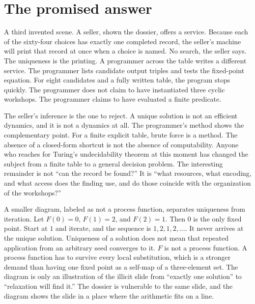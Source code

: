 \documentclass[11pt]{article}
\begin{document}
\section{The promised answer}
\label{sec:seller}

A third invented scene. A seller, shown the dossier, offers a service. Because each of the sixty-four choices has exactly one completed record, the seller’s machine will print that record at once when a choice is named. No search, the seller says. The uniqueness is the printing. A programmer across the table writes a different service. The programmer lists candidate output triples and tests the fixed-point equation. For eight candidates and a fully written table, the program stops quickly. The programmer does not claim to have instantiated three cyclic workshops. The programmer claims to have evaluated a finite predicate.

The seller’s inference is the one to reject. A unique solution is not an efficient dynamics, and it is not a dynamics at all. The programmer’s method shows the complementary point. For a finite explicit table, brute force is a method. The absence of a closed-form shortcut is not the absence of computability. Anyone who reaches for Turing’s undecidability theorem at this moment has changed the subject from a finite table to a general decision problem. The interesting remainder is not ``can the record be found?'' It is ``what resources, what encoding, and what access does the finding use, and do those coincide with the organization of the workshops?''

A smaller diagram, labeled as not a process function, separates uniqueness from iteration. Let \(F(0) = 0\), \(F(1) = 2\), and \(F(2) = 1\). Then \(0\) is the only fixed point. Start at \(1\) and iterate, and the sequence is \(1, 2, 1, 2, \ldots\). It never arrives at the unique solution. Uniqueness of a solution does not mean that repeated application from an arbitrary seed converges to it. \(F\) is not a process function. A process function has to survive every local substitution, which is a stronger demand than having one fixed point as a self-map of a three-element set. The diagram is only an illustration of the illicit slide from ``exactly one solution'' to ``relaxation will find it.'' The dossier is vulnerable to the same slide, and the diagram shows the slide in a place where the arithmetic fits on a line.
\end{document}
